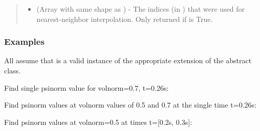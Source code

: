 \documentclass[letterpaper,10pt,english]{sphinxmanual}
\begin{document}
\begin{fulllineitems}
\begin{fulllineitems}
\begin{quote}
\begin{description}
\begin{itemize}
\item {} 
 (Array with same shape as ) - The indices
(in ) that were used for
nearest-neighbor interpolation. Only returned if  is
True.

\end{itemize}


\end{description}\end{quote}
\subsubsection*{Examples}

All assume that  is a valid instance of the appropriate
extension of the {\hyperref[\detokenize{eqtools:eqtools.core.Equilibrium}]{}} abstract class.

Find single psinorm value for volnorm=0.7, t=0.26s:

\begin{sphinxVerbatim}[commandchars=\\\{\}]
   
\end{sphinxVerbatim}

Find psinorm values at volnorm values of 0.5 and 0.7 at the single time
t=0.26s:

\begin{sphinxVerbatim}[commandchars=\\\{\}]
  \PYG{p}{[} \PYG{p}{]} 
\end{sphinxVerbatim}

Find psinorm values at volnorm=0.5 at times t={[}0.2s, 0.3s{]}:

\begin{sphinxVerbatim}[commandchars=\\\{\}]
   \PYG{p}{[} \PYG{p}{]}
\end{sphinxVerbatim}


\end{fulllineitems}
\end{fulllineitems}
\end{document}
